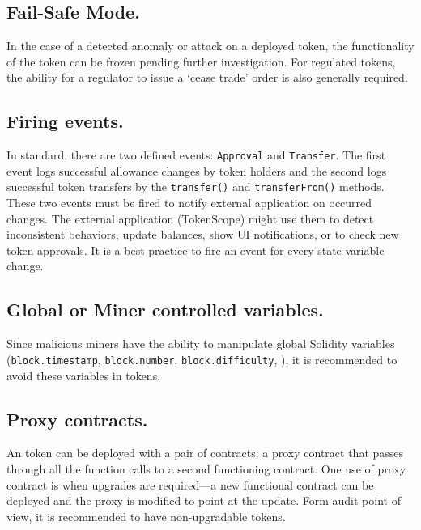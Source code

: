 \subsection{Fail-Safe Mode.}\label{subsec:failsf}

In the case of a detected anomaly or attack on a deployed \erc token, the functionality of the token can be frozen pending further investigation. For regulated tokens, the ability for a regulator to issue a `cease trade' order is also generally required. 

\subsection{Firing events.}\label{subsec:evnts}

In \erc standard, there are two defined events: \texttt{Approval} and \texttt{Transfer}. The first event logs successful allowance changes by token holders and the second logs successful token transfers by the \texttt{transfer()} and \texttt{transferFrom()} methods. These two events must be fired to notify external application on occurred changes. The external application (\eg TokenScope\cite{TokenScope}) might use them to detect inconsistent behaviors, update balances, show UI notifications, or to check new token approvals. It is a best practice to fire an event for every state variable change.

\subsection{Global or Miner controlled variables.}\label{subsec:miner}

Since malicious miners have the ability to manipulate global Solidity variables (\eg \texttt{block.timestamp}, \texttt{block.number}, \texttt{block.difficulty}, \etc), it is recommended to avoid these variables in \erc tokens.

\subsection{Proxy contracts.}\label{subsec:prxy}

An \erc token can be deployed with a pair of contracts: a proxy contract that passes through all the function calls to a second functioning \erc contract\cite{ProxyContract,ProxyPatterns}. One use of proxy contract is when upgrades are required---a new functional contract can be deployed and the proxy is modified to point at the update. Form audit point of view, it is recommended to have non-upgradable \erc tokens. 

